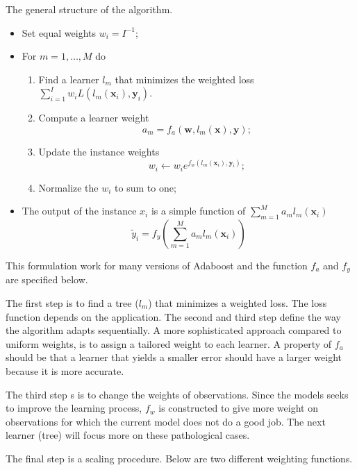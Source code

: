 The general structure of the algorithm.
\begin{itemize}
    \item Set equal weights $w_{i} = I^{-1}$;
    \item For $m = 1,\dots, M$ do
    \begin{enumerate}
        \item Find a learner $l_{m}$ that minimizes the weighted loss $\sum _{i=1}^{I}w_{i}L(l_{m}(\mathbf{x}_{i}), \mathbf{y}_{i})$.
        \item Compute a learner weight
        \begin{equation}
            a_{m} = f_{a}(\mathbf{w}, l_{m}(\mathbf{x}), \mathbf{y});
        \end{equation}
        \item Update the instance weights
        \begin{equation}
            w_{i} \leftarrow w_{i} e^{ f_{w}(l_{m}(\mathbf{x}_{i}), \mathbf{y}_{i}) };
        \end{equation}
        \item Normalize the $w_{i}$ to sum to one;
    \end{enumerate}
    \item The output of the instance $x_{i}$ is a simple function of $\sum _{m=1}^{M}a_{m}l_{m}(\mathbf{x}_{i})$
    \begin{equation}
        \tilde{y}_{i} = f_{y} \left(\sum _{m=1}^{M}a_{m}l_{m}(\mathbf{x}_{i})\right)
    \end{equation}
\end{itemize}
This formulation work for many versions of Adaboost and the function $f_{a}$ and $f_{y}$ are specified below.

The first step is to find a tree ($l_{m}$) that minimizes a weighted loss. The loss function depends on the application. The second and third step define the way the algorithm adapts sequentially. A more sophisticated approach compared to uniform weights, is to assign a tailored weight to each learner. A property of $f_{a}$  should be that a learner that yields a smaller error should have a larger weight because it is more accurate. 

The third step s is to change the weights of observations. Since the models seeks to improve the learning process, $f_{w}$ is constructed to give more weight on observations for which the current model does not do a good job. The next learner (tree) will focus more on these pathological cases.

The final step is a scaling procedure. Below are two different weighting functions.

